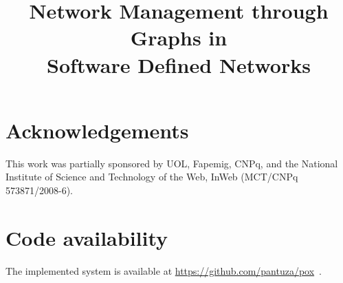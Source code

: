 \documentclass[english,10pt,a4paper,twocolumn,conference,final]{IEEEtran}
\begin{document}
\title{Network Management through Graphs in\\
Software Defined Networks}


\author{
}



\maketitle










\section*{Acknowledgements}

This work was partially sponsored by
UOL, %
Fapemig, CNPq, and the National Institute of Science and
Technology of the Web, InWeb (MCT/CNPq 573871/2008-6).

\section*{Code availability}

The implemented system is available at
\url{https://github.com/pantuza/pox}~\cite{gustavo2013modulo}.



\end{document}
